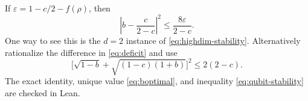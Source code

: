 If $\varepsilon=1-c/2-f(\rho)$, then
\begin{equation}\label{eq:qubit-stability}
 \left|b-\frac{c}{2-c}\right|^2\le\frac{8\varepsilon}{2-c}.
\end{equation}
One way to see this is the $d=2$ instance of \eqref{eq:highdim-stability}. Alternatively rationalize the difference in \eqref{eq:deficit} and use
\[
 \bigl[\sqrt{1-b}+\sqrt{(1-c)(1+b)}\bigr]^2\le2(2-c).
\]
The exact identity, unique value \eqref{eq:boptimal}, and inequality \eqref{eq:qubit-stability} are checked in Lean.

